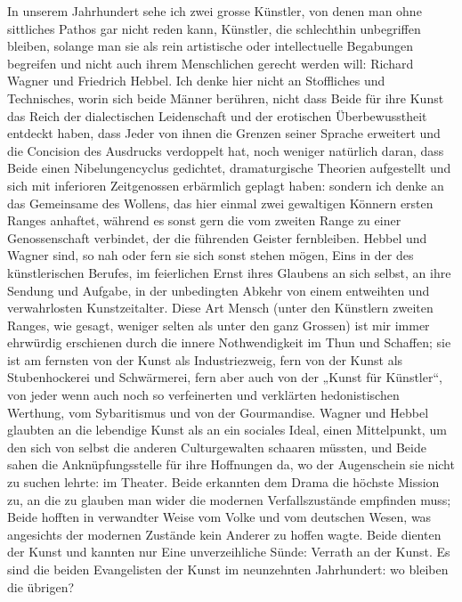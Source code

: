 In unserem Jahrhundert sehe ich zwei grosse Künstler, von denen man ohne sittliches Pathos gar nicht reden kann, Künstler, die schlechthin unbegriffen bleiben, solange man sie als rein artistische oder intellectuelle Begabungen begreifen und nicht auch ihrem Menschlichen gerecht werden will: Richard Wagner und Friedrich Hebbel. Ich denke hier nicht an Stoffliches und Technisches, worin sich beide Männer berühren, nicht dass Beide für ihre Kunst das Reich der dialectischen Leidenschaft und der erotischen Überbewusstheit entdeckt haben, dass Jeder von ihnen die Grenzen seiner Sprache erweitert und die Concision des Ausdrucks verdoppelt hat, noch weniger natürlich daran, dass Beide einen Nibelungencyclus gedichtet, dramaturgische Theorien aufgestellt und sich mit inferioren Zeitgenossen erbärmlich geplagt haben: sondern ich denke an das Gemeinsame des Wollens, das hier einmal zwei gewaltigen Könnern ersten Ranges anhaftet, während es sonst gern die vom zweiten Range zu einer Genossenschaft verbindet, der die führenden Geister fernbleiben. Hebbel und Wagner sind, so nah oder fern sie sich sonst stehen mögen, Eins in der  des künstlerischen Berufes, im feierlichen Ernst ihres Glaubens an sich selbst, an ihre Sendung und Aufgabe, in der unbedingten Abkehr von einem entweihten und verwahrlosten Kunstzeitalter. Diese Art Mensch (unter den Künstlern zweiten Ranges, wie gesagt, weniger selten als unter den ganz Grossen) ist mir immer ehrwürdig erschienen durch die innere Nothwendigkeit im Thun und Schaffen; sie ist am fernsten von der Kunst als Industriezweig, fern von der Kunst als Stubenhockerei und Schwärmerei, fern aber auch von der „Kunst für Künstler“, von jeder wenn auch noch so verfeinerten und verklärten hedonistischen Werthung, vom Sybaritismus und von der Gourmandise. Wagner und Hebbel glaubten an die lebendige Kunst als an ein sociales Ideal, einen Mittelpunkt, um den sich von selbst die anderen Culturgewalten schaaren müssten, und Beide sahen die Anknüpfungsstelle für ihre Hoffnungen da, wo der Augenschein sie nicht zu suchen lehrte: im Theater. Beide erkannten dem Drama die höchste Mission zu, an die zu glauben man wider die modernen Verfallszustände empfinden muss; Beide hofften in verwandter Weise vom Volke und vom deutschen Wesen, was angesichts der modernen Zustände kein Anderer zu hoffen wagte. Beide dienten der Kunst und kannten nur Eine unverzeihliche Sünde: Verrath an der Kunst. Es sind die beiden Evangelisten der Kunst im neunzehnten Jahrhundert: wo bleiben die übrigen?
\par

